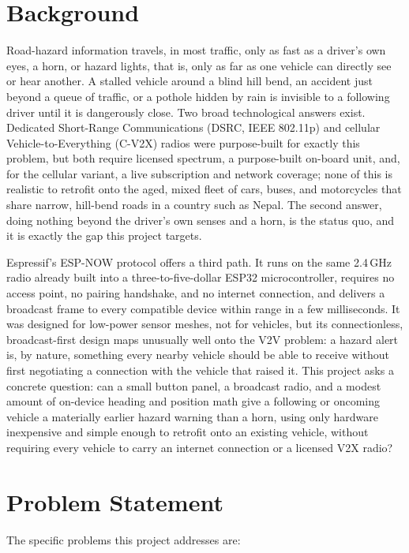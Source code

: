 \documentclass[12pt,a4paper]{report}
\begin{document}
\section{Background}
Road-hazard information travels, in most traffic, only as fast as a driver's own eyes, a horn, or hazard lights, that is, only as far as one vehicle can directly see or hear another. A stalled vehicle around a blind hill bend, an accident just beyond a queue of traffic, or a pothole hidden by rain is invisible to a following driver until it is dangerously close. Two broad technological answers exist. Dedicated Short-Range Communications (DSRC, IEEE 802.11p) and cellular Vehicle-to-Everything (C-V2X) radios were purpose-built for exactly this problem, but both require licensed spectrum, a purpose-built on-board unit, and, for the cellular variant, a live subscription and network coverage; none of this is realistic to retrofit onto the aged, mixed fleet of cars, buses, and motorcycles that share narrow, hill-bend roads in a country such as Nepal. The second answer, doing nothing beyond the driver's own senses and a horn, is the status quo, and it is exactly the gap this project targets.

Espressif's ESP-NOW protocol offers a third path. It runs on the same 2.4\,GHz radio already built into a three-to-five-dollar ESP32 microcontroller, requires no access point, no pairing handshake, and no internet connection, and delivers a broadcast frame to every compatible device within range in a few milliseconds. It was designed for low-power sensor meshes, not for vehicles, but its connectionless, broadcast-first design maps unusually well onto the V2V problem: a hazard alert is, by nature, something every nearby vehicle should be able to receive without first negotiating a connection with the vehicle that raised it. This project asks a concrete question: can a small button panel, a broadcast radio, and a modest amount of on-device heading and position math give a following or oncoming vehicle a materially earlier hazard warning than a horn, using only hardware inexpensive and simple enough to retrofit onto an existing vehicle, without requiring every vehicle to carry an internet connection or a licensed V2X radio?

\section{Problem Statement}
The specific problems this project addresses are:
\end{document}
